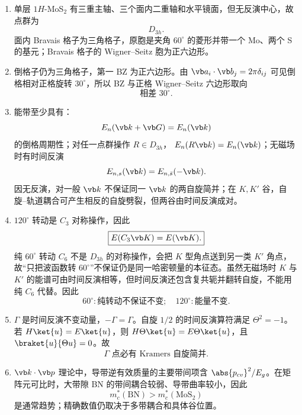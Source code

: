 \begin{question}[20 分]
\begin{solution}
\begin{enumerate}
  \item 单层 $1H$-MoS$_2$ 有三重主轴、三个面内二重轴和水平镜面，但无反演中心，故点群为
  \[
    \boxed{D_{3h}.}
  \]
  面内 Bravais 格子为三角格子，原胞是夹角 $60^\circ$ 的菱形并带一个 Mo、两个 S 的基元；Bravais 格子的 Wigner--Seitz 胞为正六边形。
  \item 倒格子仍为三角格子，第一 BZ 为正六边形。由
  $\vb a_i\cdot\vb b_j=2\pi\delta_{ij}$ 可见倒格相对正格旋转 $30^\circ$，所以 BZ 与正格 Wigner--Seitz 六边形取向
  \[
    \boxed{\text{相差 }30^\circ.}
  \]
  \item 能带至少具有：
  \[
    E_n(\vb k+\vb G)=E_n(\vb k)
  \]
  的倒格周期性；对任一点群操作 $R\in D_{3h}$，
  $E_n(R\vb k)=E_n(\vb k)$；无磁场时有时间反演
  \[
    E_{n,s}(\vb k)=E_{n,\bar s}(-\vb k).
  \]
  因无反演，对一般 $\vb k$ 不保证同一 $\vb k$ 的两自旋简并；在 $K,K'$ 谷，自旋--轨道耦合可产生相反的自旋劈裂，但两谷由时间反演成对。
  \item $120^\circ$ 转动是 $C_3$ 对称操作，因此
  \[
    \boxed{E(C_3\vb K)=E(\vb K).}
  \]
  纯 $60^\circ$ 转动 $C_6$ 不是 $D_{3h}$ 的对称操作，会把 $K$ 型角点送到另一类 $K'$ 角点，故“只把波函数转 $60^\circ$”不保证仍是同一哈密顿量的本征态。虽然无磁场时 $K$ 与 $K'$ 的能谱可由时间反演相等，但时间反演还包含复共轭并翻转自旋，不能用纯 $C_6$ 代替。因此
  \[
    \boxed{60^\circ:\text{纯转动不保证不变};\quad120^\circ:\text{能量不变}.}
  \]
  \item $\Gamma$ 是时间反演不变动量，$-\Gamma=\Gamma$。自旋 $1/2$ 的时间反演算符满足 $\Theta^2=-1$。若
  $H\ket{u}=E\ket{u}$，则
  $H\Theta\ket{u}=E\Theta\ket{u}$，且
  $\braket{u}{\Theta u}=0$。故
  \[
    \boxed{\Gamma\text{ 点必有 Kramers 自旋简并}.}
  \]
  \item $\vb k\cdot\vb p$ 理论中，导带逆有效质量的主要带间项含
  $\abs{p_{cv}}^2/E_g$。在矩阵元可比时，大带隙 BN 的带间耦合较弱、导带曲率较小，因此
  \[
    \boxed{m_c^*(\mathrm{BN})>m_c^*(\mathrm{MoS_2})}
  \]
  是通常趋势；精确数值仍取决于多带耦合和具体谷位置。
\end{enumerate}
\end{solution}
\end{question}

